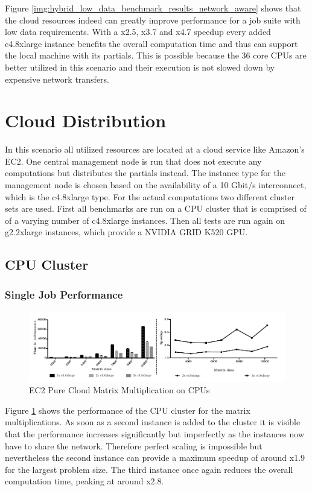 Figure \ref{img:hybrid_low_data_benchmark_results_network_aware} shows that the cloud resources indeed can greatly improve performance for a job suite with low data requirements. With a x2.5, x3.7 and x4.7 speedup every added c4.8xlarge instance benefits the overall computation time and thus can support the local machine with its partials. This is possible because the 36 core CPUs are better utilized in this scenario and their execution is not slowed down by expensive network transfers.

\section{Cloud Distribution}

In this scenario all utilized resources are located at a cloud service like Amazon's EC2. One central management node is run that does not execute any computations but distributes the partials instead. The instance type for the management node is chosen based on the availability of a 10 Gbit/s interconnect, which is the c4.8xlarge type. For the actual computations two different cluster sets are used. First all benchmarks are run on a CPU cluster that is comprised of of a varying number of c4.8xlarge instances. Then all tests are run again on g2.2xlarge instances, which provide a NVIDIA GRID K520 GPU.

\subsection{CPU Cluster}
\subsubsection*{Single Job Performance}
\begin{figure}[H]	
	\includegraphics[width=1.0\textwidth]{images/ec2_cpu_matrix_multiplication.pdf}
	\centering
	\caption{EC2 Pure Cloud Matrix Multiplication on CPUs}
	\label{img:ec2_cpu_matrix_multiplication}
\end{figure}

Figure \ref{img:ec2_cpu_matrix_multiplication} shows the performance of the CPU cluster for the matrix multiplications. As soon as a second instance is added to the cluster it is visible that the performance increases significantly but imperfectly as the instances now have to share the network. Therefore perfect scaling is impossible but nevertheless the second instance can provide a maximum speedup of around x1.9 for the largest problem size. The third instance once again reduces the overall computation time, peaking at around x2.8.

